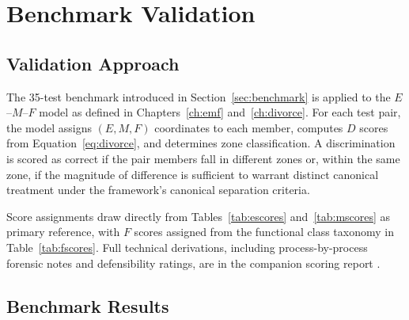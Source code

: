 \documentclass[12pt,a3paper]{article}
\begin{document}
\newpage


\section{Benchmark Validation}
\label{ch:validation}

\subsection{Validation Approach}

The 35-test benchmark introduced in Section~\ref{sec:benchmark} is applied to the $E$--$M$--$F$ model as defined in Chapters~\ref{ch:emf} and~\ref{ch:divorce}. For each test pair, the model assigns $(E, M, F)$ coordinates to each member, computes $D$ scores from Equation~\ref{eq:divorce}, and determines zone classification. A discrimination is scored as correct if the pair members fall in different zones or, within the same zone, if the magnitude of difference is sufficient to warrant distinct canonical treatment under the framework's canonical separation criteria.

Score assignments draw directly from Tables~\ref{tab:escores} and~\ref{tab:mscores} as primary reference, with $F$ scores assigned from the functional class taxonomy in Table~\ref{tab:fscores}. Full technical derivations, including process-by-process forensic notes and defensibility ratings, are in the companion scoring report \cite{EMF_JustificationCompanion}.

\subsection{Benchmark Results}
\end{document}
